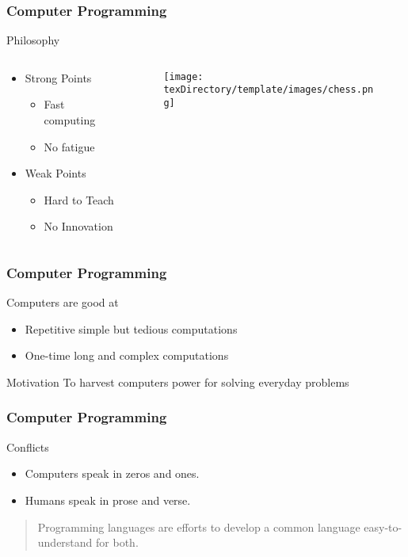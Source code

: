 \documentclass[10pt, compress]{beamer}
\begin{document}
\begin{frame}[fragile]
	\frametitle{Computer Programming}
	\begin{block}{Philosophy}
		\begin{columns}
			\begin{column}{0.4\textwidth}
			\begin{itemize}
				\item[] Strong Points
				\begin{itemize}
					\item[] Fast computing
					\item[] No fatigue
				\end{itemize}
				\item[] Weak Points
				\begin{itemize}
					\item[] Hard to Teach
					\item[] No Innovation
				\end{itemize}
			\end{itemize}
			\end{column}
			\begin{column}{0.6\textwidth}
			\begin{figure}[H]\centering
				\texttt{[image: \\texDirectory/template/images/chess.png]}
			\end{figure}
			\end{column}
		\end{columns}
	\end{block}
\end{frame}

\begin{frame}[fragile]
	\frametitle{Computer Programming}
	\begin{block}{Computers are good at}
		\begin{itemize}
			\item[] Repetitive simple but tedious computations
			\item[] One-time long and complex computations
		\end{itemize}
	\end{block}
	\begin{block}{Motivation}
		To harvest computers power for solving everyday problems
	\end{block}
\end{frame}

\begin{frame}[fragile]
	\frametitle{Computer Programming}
	\begin{block}{Conflicts}
		\begin{itemize}
			\item[] Computers speak in zeros and ones.
			\item[] Humans speak in prose and verse.
		\end{itemize}
	\end{block}
	\begin{quote}
		Programming languages are efforts to develop a common language easy-to-understand for both.
	\end{quote}
\end{frame}
\end{document}
